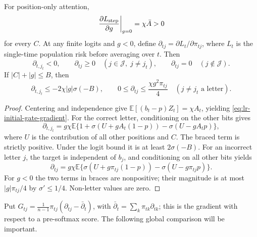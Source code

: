 \begin{lrlemma}
\label{lem:lr-signs}
For position-only attention,
\begin{equation}\label{eq:lr-initial-gate-gradient}
 \left.\frac{\partial L_{\mathrm{step}}}{\partial g}\right|_{g=0}
 =\chi\bar A>0
\end{equation}
for every $C$.  At any finite logits and $g<0$, define
$\partial_{tj}=\partial L_t/\partial \pi_{tj}$, where $L_t$ is the single-time
population risk before averaging over $t$.  Then
\begin{equation}\label{eq:lr-feature-source-signs}
 \partial_{t,j_t}<0,\qquad \partial_{tj}\ge0
 \quad(j\in\mathcal J,\;j\ne j_t),\qquad
 \partial_{tj}=0\quad(j\notin\mathcal J).
\end{equation}
If $|C|+|g|\le B$, then
\begin{equation}\label{eq:lr-source-bounds}
 \partial_{t,j_t}\le-2\chi|g|\sigma(-B),\qquad
 0\le \partial_{tj}\le\frac{\chi g^2\pi_{tj}}4\quad(j\ne j_t\text{ a letter}).
\end{equation}
\end{lrlemma}
\begin{proof}
Centering and independence give
$\mathbb E[(b_t-p)Z_t]=\chi A_t$, yielding
\eqref{eq:lr-initial-gate-gradient}.  For the correct letter,
conditioning on the other bits gives
\[
 \partial_{t,j_t}=g\chi\mathbb E
 \{1+\sigma(U+gA_t(1-p))-\sigma(U-gA_tp)\},
\]
where $U$ is the contribution of all other positions and $C$.
The braced term is strictly positive.  Under the logit bound it is at
least $2\sigma(-B)$.  For an incorrect letter $j$, the target is
independent of $b_j$, and conditioning on all other bits yields
\[
 \partial_{tj}=g\chi\mathbb E
 \{\sigma(U+g\pi_{tj}(1-p))-\sigma(U-g\pi_{tj}p)\}.
\]
For $g<0$ the two terms in braces are nonpositive; their magnitude is
at most $|g|\pi_{tj}/4$ by $\sigma'\le1/4$.  Non-letter values are zero.
\end{proof}

Put $G_{tj}=\frac1{n-1}\pi_{tj}(\partial_{tj}-\bar\partial_t)$, with
$\bar\partial_t=\sum_k\pi_{tk}\partial_{tk}$; this is the gradient with respect to a
pre-softmax score.  The following global comparison will be important.

